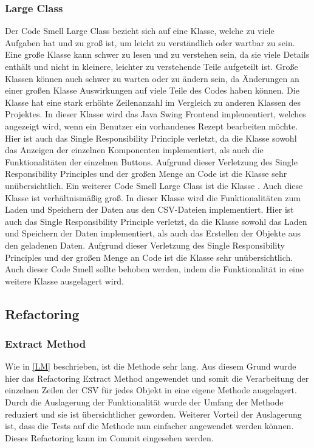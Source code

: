 \subsubsection{Large Class}
Der Code Smell Large Class bezieht sich auf eine Klasse, welche zu viele Aufgaben hat und zu groß ist, um leicht zu verständlich oder wartbar zu sein. Eine große Klasse kann schwer zu lesen und zu verstehen sein, da sie viele Details enthält und nicht in kleinere, leichter zu verstehende Teile aufgeteilt ist. Große Klassen können auch schwer zu warten oder zu ändern sein, da Änderungen an einer großen Klasse Auswirkungen auf viele Teile des Codes haben können. Die Klasse \href{https://github.com/MichaelaHaag/RezeptApp/blob/main/0-Plugins/src/main/java/de/rezeptapp/plugins/gui/RezeptBearbeiten.java}{} hat eine stark erhöhte Zeilenanzahl im Vergleich zu anderen Klassen des Projektes. In dieser Klasse wird das Java Swing Frontend implementiert, welches angezeigt wird, wenn ein Benutzer ein vorhandenes Rezept bearbeiten möchte. Hier ist auch das Single Responsibility Principle verletzt, da die Klasse sowohl das Anzeigen der einzelnen Komponenten implementiert, als auch die Funktionalitäten der einzelnen Buttons. Aufgrund dieser Verletzung des Single Responsibility Principles und der großen Menge an Code ist die Klasse sehr unübersichtlich. Ein weiterer Code Smell Large Class ist die Klasse \href{https://github.com/MichaelaHaag/RezeptApp/blob/main/1-Adapter/src/main/java/de/rezeptapp/adapter/Datenpersistenz/DataReader.java}{}. Auch diese Klasse ist verhältnismäßig groß. In dieser Klasse wird die Funktionalitäten zum Laden und Speichern der Daten aus den CSV-Dateien implementiert. Hier ist auch das Single Responsibility Principle verletzt, da die Klasse sowohl das Laden und Speichern der Daten implementiert, als auch das Erstellen der Objekte aus den geladenen Daten. Aufgrund dieser Verletzung des Single Responsibility Principles und der großen Menge an Code ist die Klasse sehr unübersichtlich. Auch dieser Code Smell sollte behoben werden, indem die Funktionalität in eine weitere Klasse ausgelagert wird.

\subsection{Refactoring}
\subsubsection{Extract Method}
Wie in \autoref{LM} beschrieben, ist die Methode  sehr lang. Aus diesem Grund wurde hier das Refactoring Extract Method angewendet und somit die Verarbeitung der einzelnen Zeilen der CSV für jedes Objekt in eine eigene Methode ausgelagert.
Durch die Auslagerung der Funktionalität wurde der Umfang der Methode reduziert und sie ist übersichtlicher geworden. 
Weiterer Vorteil der Auslagerung ist, dass die Tests auf die Methode nun einfacher angewendet werden können. 
Dieses Refactoring kann im Commit \href{https://github.com/MichaelaHaag/RezeptApp/commit/d3ace6a38e46831cee35d0b270c41c4fd5783162}{} eingesehen werden.

